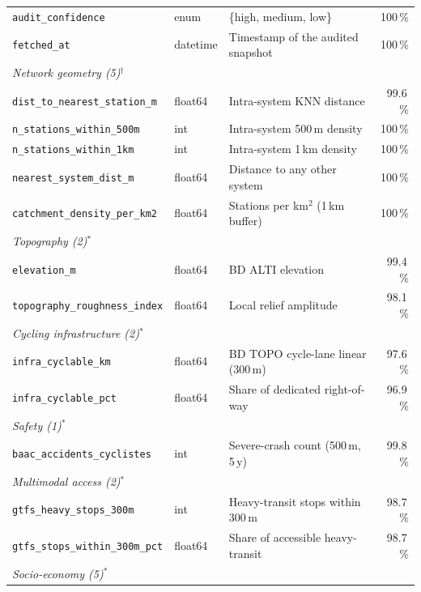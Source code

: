 \documentclass[11pt,a4paper]{article}
\begin{document}
{\begin{longtable}{@{}lllr@{}}
\quad\texttt{audit\_confidence}  & enum    & \{high, medium, low\}                          & 100\,\%\\
\quad\texttt{fetched\_at}        & datetime& Timestamp of the audited snapshot              & 100\,\%\\
\midrule
\multicolumn{4}{l}{\textit{Network geometry (5)$^\dag$}}\\
\quad\texttt{dist\_to\_nearest\_station\_m}  & float64 & Intra-system KNN distance      & 99.6\,\%\\
\quad\texttt{n\_stations\_within\_500m}     & int     & Intra-system 500\,m density     & 100\,\%\\
\quad\texttt{n\_stations\_within\_1km}      & int     & Intra-system 1\,km density      & 100\,\%\\
\quad\texttt{nearest\_system\_dist\_m}      & float64 & Distance to any other system    & 100\,\%\\
\quad\texttt{catchment\_density\_per\_km2}  & float64 & Stations per km$^2$ (1\,km buffer)& 100\,\%\\
\midrule
\multicolumn{4}{l}{\textit{Topography (2)$^\ast$}}\\
\quad\texttt{elevation\_m}                  & float64 & BD ALTI elevation                & 99.4\,\%\\
\quad\texttt{topography\_roughness\_index}  & float64 & Local relief amplitude           & 98.1\,\%\\
\midrule
\multicolumn{4}{l}{\textit{Cycling infrastructure (2)$^\ast$}}\\
\quad\texttt{infra\_cyclable\_km}           & float64 & BD TOPO cycle-lane linear (300\,m) & 97.6\,\%\\
\quad\texttt{infra\_cyclable\_pct}          & float64 & Share of dedicated right-of-way  & 96.9\,\%\\
\midrule
\multicolumn{4}{l}{\textit{Safety (1)$^\ast$}}\\
\quad\texttt{baac\_accidents\_cyclistes}    & int     & Severe-crash count (500\,m, 5\,y)  & 99.8\,\%\\
\midrule
\multicolumn{4}{l}{\textit{Multimodal access (2)$^\ast$}}\\
\quad\texttt{gtfs\_heavy\_stops\_300m}      & int     & Heavy-transit stops within 300\,m   & 98.7\,\%\\
\quad\texttt{gtfs\_stops\_within\_300m\_pct}& float64 & Share of accessible heavy-transit  & 98.7\,\%\\
\midrule
\multicolumn{4}{l}{\textit{Socio-economy (5)$^\ast$}}\\

\end{longtable}}
\end{document}
